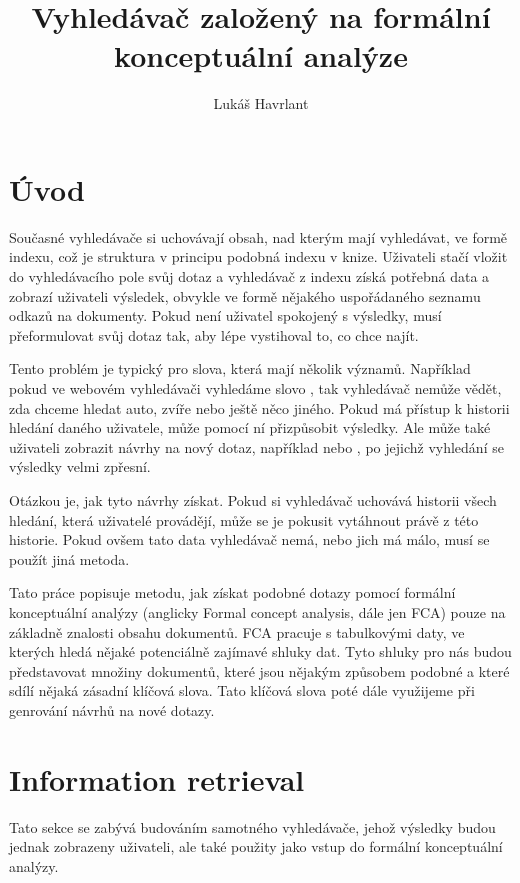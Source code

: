 \documentclass[12pt]{article}
\title{Vyhledávač založený na formální konceptuální analýze}
\author{Lukáš Havrlant}
\begin{document}
\maketitle
\newpage


\section*{Úvod}

Současné vyhledávače si uchovávají obsah, nad kterým mají vyhledávat, ve formě indexu, což je struktura v principu podobná indexu v knize. Uživateli stačí vložit do vyhledávacího pole svůj dotaz a vyhledávač z indexu získá potřebná data a zobrazí uživateli výsledek, obvykle ve formě nějakého uspořádaného seznamu odkazů na dokumenty. Pokud není uživatel spokojený s výsledky, musí přeformulovat svůj dotaz tak, aby lépe vystihoval to, co chce najít. 

Tento problém je typický pro slova, která mají několik významů. Například pokud ve webovém vyhledávači vyhledáme slovo , tak vyhledávač nemůže vědět, zda chceme hledat auto, zvíře nebo ještě něco jiného. Pokud má přístup k historii hledání daného uživatele, může pomocí ní přizpůsobit výsledky. Ale může také uživateli zobrazit návrhy na nový dotaz, například  nebo , po jejichž vyhledání se výsledky velmi zpřesní. 

Otázkou je, jak tyto návrhy získat. Pokud si vyhledávač uchovává historii všech hledání, která uživatelé provádějí, může se je pokusit vytáhnout právě z této historie. Pokud ovšem tato data vyhledávač nemá, nebo jich má málo, musí se použít jiná metoda. 

Tato práce popisuje metodu, jak získat podobné dotazy pomocí formální konceptuální analýzy (anglicky Formal concept analysis, dále jen FCA) pouze na základně znalosti obsahu dokumentů. FCA pracuje s tabulkovými daty, ve kterých hledá nějaké potenciálně zajímavé shluky dat. Tyto shluky pro nás budou představovat množiny dokumentů, které jsou nějakým způsobem podobné a které sdílí nějaká zásadní klíčová slova. Tato klíčová slova poté dále využijeme při genrování návrhů na nové dotazy.  

\newpage
\section{Information retrieval}

Tato sekce se zabývá budováním samotného vyhledávače, jehož výsledky budou jednak zobrazeny uživateli, ale také použity jako vstup do formální konceptuální analýzy. 
\end{document}
